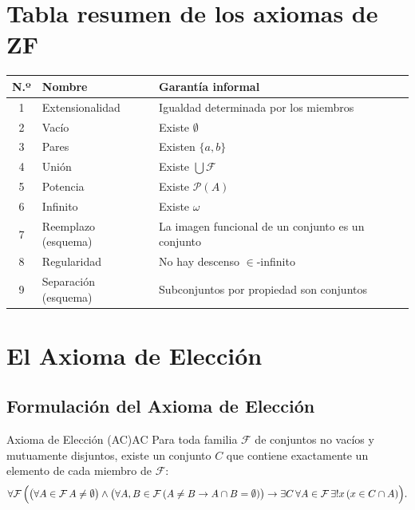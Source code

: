 \section{Tabla resumen de los axiomas de ZF}

\begin{center}
\renewcommand{\arraystretch}{1.4}
\begin{tabular}{|c|l|p{7cm}|}
\hline
\textbf{N.º} & \textbf{Nombre} & \textbf{Garantía informal} \\
\hline
1 & Extensionalidad & Igualdad determinada por los miembros \\
2 & Vacío & Existe $\emptyset$ \\
3 & Pares & Existen $\{a, b\}$ \\
4 & Unión & Existe $\bigcup \mathcal{F}$ \\
5 & Potencia & Existe $\mathcal{P}(A)$ \\
6 & Infinito & Existe $\omega$ \\
7 & Reemplazo (esquema) & La imagen funcional de un conjunto es un conjunto \\
8 & Regularidad & No hay descenso $\in$-infinito \\
9 & Separación (esquema) & Subconjuntos por propiedad son conjuntos \\
\hline
\end{tabular}
\end{center}

\section{El Axioma de Elección}

\subsection{Formulación del Axioma de Elección}

\begin{definicion}{Axioma de Elección (AC)}{AC}
Para toda familia $\mathcal{F}$ de conjuntos no vacíos y mutuamente disjuntos, existe un conjunto $C$ que contiene exactamente un elemento de cada miembro de $\mathcal{F}$:
\[
  \forall \mathcal{F}\,\Bigl(\bigl(\forall A \in \mathcal{F}\, A \neq \emptyset\bigr) \wedge \bigl(\forall A,B \in \mathcal{F}\,(A \neq B \to A \cap B = \emptyset)\bigr)
  \to \exists C\,\forall A \in \mathcal{F}\,\exists! x\,(x \in C \cap A)\Bigr).
\]
\end{definicion}

